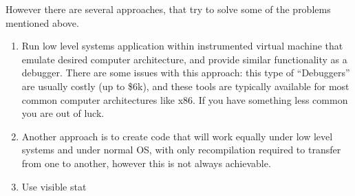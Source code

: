 \documentclass{article}
\begin{document}
However there are several approaches, that try to solve some of the problems mentioned above.\\
\begin{enumerate}[1.]
\item Run low level systems application within instrumented virtual machine that emulate desired 
computer architecture, and provide similar functionality as a debugger. 
    There are some issues with this approach: this type of ``Debuggers'' are
usually costly (up to \$6k), and these tools are typically available for most common
computer architectures like x86. If you have something less common you are out of luck.
\item Another approach is to create code that will
work equally under low level systems and under normal OS, with only recompilation required
to transfer from one to another, however this is not always achievable.
\item Use visible stat

\end{enumerate}

\end{document}
